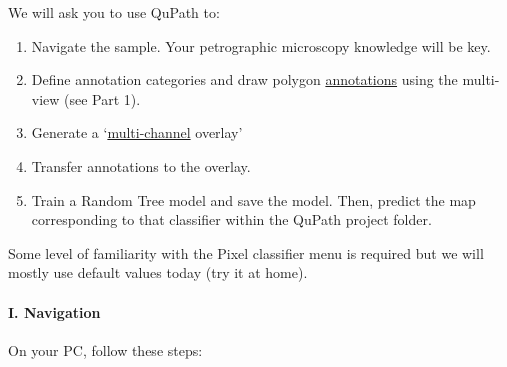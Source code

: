 	We will ask you to use QuPath to:
	
	\begin{enumerate}
		\def\labelenumi{\Roman{enumi}.}
		\item
		Navigate the sample. Your petrographic microscopy knowledge will be key.
		\item
		Define annotation categories and draw polygon \ul{annotations} using the multi-view (see Part 1).
		\item
		Generate a `\ul{multi-channel} overlay'
		\item
		Transfer annotations to the overlay.
		\item
		Train a Random Tree model and save the model. Then, predict the map corresponding to that classifier within the QuPath project folder.
	\end{enumerate}
	
	Some level of familiarity with the Pixel classifier menu is required but we will mostly use default values today (try it at home).
	
	\paragraph{I. Navigation}\label{i.-navigation}
	
	On your PC, follow these steps:
	
